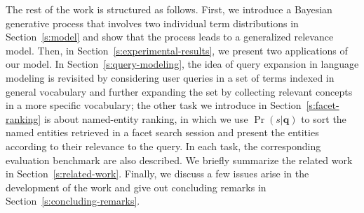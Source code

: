 The rest of the work is structured as follows.  First, we introduce a Bayesian
generative process that involves two individual term distributions in
Section~\ref{s:model} and show that the process leads to a generalized relevance
model.  Then, in Section~\ref{s:experimental-results}, we present two
applications of our model.  In Section~\ref{s:query-modeling}, the idea of
query expansion in language modeling is revisited by considering user queries
in a set of terms indexed in general vocabulary and further expanding the set
by collecting relevant concepts in a more specific vocabulary; the other task
we introduce in Section~\ref{s:facet-ranking} is about named-entity ranking, in
which we use $\Pr(s|\mathbf{q})$ to sort the named entities retrieved in a facet search
session and present the entities according to their relevance to the query.  In
each task, the corresponding evaluation benchmark are also described.  We
briefly summarize the related work in Section~\ref{s:related-work}.  Finally,
we discuss a few issues arise in the development of the work and give out
concluding remarks in Section~\ref{s:concluding-remarks}.

% 

